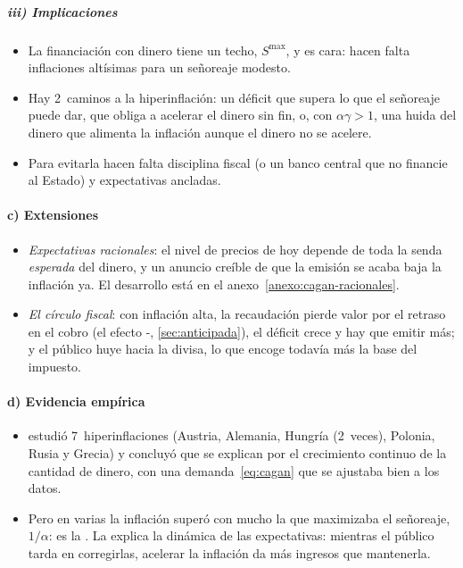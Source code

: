 \documentclass[11pt]{article}
\begin{document}
\subparagraph{iii) Implicaciones}

\begin{itemize}
\item La financiación con dinero tiene un techo, $S^{\max}$, y es cara: hacen falta inflaciones altísimas para un señoreaje modesto.
\item Hay 2~caminos a la hiperinflación: un déficit que supera lo que el señoreaje puede dar, que obliga a acelerar el dinero sin fin, o, con $\alpha\gamma>1$, una huida del dinero que alimenta la inflación aunque el dinero no se acelere.
\item Para evitarla hacen falta disciplina fiscal (o un banco central que no financie al Estado) y expectativas ancladas.
\end{itemize}

\paragraph{c) Extensiones}

\begin{itemize}
\item \emph{Expectativas racionales}: el nivel de precios de hoy depende de toda la senda \emph{esperada} del dinero, y un anuncio creíble de que la emisión se acaba baja la inflación ya\nocite{SargentWallace1973Rational}. El desarrollo está en el anexo~\ref{anexo:cagan-racionales}.
\item \emph{El círculo fiscal}: con inflación alta, la recaudación pierde valor por el retraso en el cobro (el efecto -, \ref{sec:anticipada}), el déficit crece y hay que emitir más; y el público huye hacia la divisa, lo que encoge todavía más la base del impuesto.
\end{itemize}

\paragraph{d) Evidencia empírica}

\begin{itemize}
\item {} estudió 7~hiperinflaciones (Austria, Alemania, Hungría (2~veces), Polonia, Rusia y Grecia) y concluyó que se explican por el crecimiento continuo de la cantidad de dinero, con una demanda~\eqref{eq:cagan} que se ajustaba bien a los datos.
\item Pero en varias la inflación superó con mucho la que maximizaba el señoreaje, $1/\alpha$: es la . La explica la dinámica de las expectativas: mientras el público tarda en corregirlas, acelerar la inflación da más ingresos que mantenerla.
\end{itemize}
\end{document}
